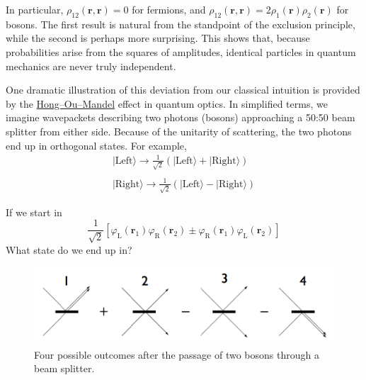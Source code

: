 \documentclass[
  a4paper,
]{scrbook}
\begin{document}
In particular, \(\rho_{12}(\mathbf{r},\mathbf{r}) = 0\) for fermions,
and
\(\rho_{12}(\mathbf{r},\mathbf{r}) = 2\rho_1(\mathbf{r})\rho_2(\mathbf{r})\)
for bosons. The first result is natural from the standpoint of the
exclusion principle, while the second is perhaps more surprising. This
shows that, because probabilities arise from the squares of amplitudes,
identical particles in quantum mechanics are never truly independent.

One dramatic illustration of this deviation from our classical intuition
is provided by the
\href{https://en.wikipedia.org/wiki/Hong\%E2\%80\%93Ou\%E2\%80\%93Mandel_effect}{Hong--Ou--Mandel}
effect in quantum optics. In simplified terms, we imagine wavepackets
describing two photons (bosons) approaching a 50:50 beam splitter from
either side. Because of the unitarity of scattering, the two photons end
up in orthogonal states. For example, \[
\begin{align}
\lvert{\text{Left}}\rangle\to\frac{1}{\sqrt{2}}\left(\lvert{\text{Left}}\rangle+ \lvert{\text{Right}}\rangle\right)\\\\
\lvert{\text{Right}}\rangle\to\frac{1}{\sqrt{2}}\left(\lvert{\text{Left}}\rangle- \lvert{\text{Right}}\rangle\right)
\end{align}
\]

\begin{tcolorbox}[enhanced jigsaw, rightrule=.15mm, opacityback=0, bottomtitle=1mm, colbacktitle=quarto-callout-tip-color!10!white, colback=white, toprule=.15mm, titlerule=0mm, arc=.35mm, title=\textcolor{quarto-callout-tip-color}{\faLightbulb}\hspace{0.5em}{Check}, left=2mm, opacitybacktitle=0.6, breakable, leftrule=.75mm, bottomrule=.15mm, colframe=quarto-callout-tip-color-frame, toptitle=1mm, coltitle=black]

If we start in \[
\frac{1}{\sqrt{2}}[\varphi_\text{L}(\mathbf{r}_1)\varphi_\text{R}(\mathbf{r}_2)\pm \varphi_\text{R}(\mathbf{r}_1)\varphi_\text{L}(\mathbf{r}_2)]
\] What state do we end up in?

\end{tcolorbox}

\begin{figure}[H]

{\centering \includegraphics{../assets/HOM.png}

}

\caption{Four possible outcomes after the passage of two bosons through
a beam splitter.}

\end{figure}%
\end{document}
